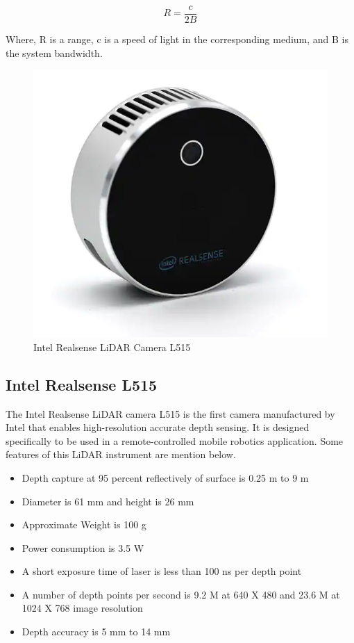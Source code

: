 \begin{equation}
R = \frac{c}{2 B}
\label{Lidarrange}
\end{equation}

Where, R is a range, c is a speed of light in the corresponding medium, and B is the system bandwidth.

\begin{figure}
    \centering
    \includegraphics[scale= 0.5]{Images/L515.png}
    \caption{Intel Realsense LiDAR Camera L515}
    \label{L515}
\end{figure}

\subsection{Intel Realsense L515}
The Intel Realsense LiDAR camera L515 is the first camera manufactured by Intel that enables high-resolution accurate depth sensing. It is designed specifically to be used in a remote-controlled mobile robotics application. Some features of this LiDAR instrument are mention below.

\begin{itemize}
\item Depth capture at 95 percent reflectively of surface is 0.25 m to 9 m
\item Diameter is 61 mm and height is 26 mm
\item Approximate Weight is 100 g
\item Power consumption is 3.5 W
\item A short exposure time of laser is less than 100 ns per depth point
\item A number of depth points per second is 9.2 M at 640 X 480 and 23.6 M at 1024 X 768 image resolution
\item Depth accuracy is 5 mm to 14 mm
\end{itemize}

